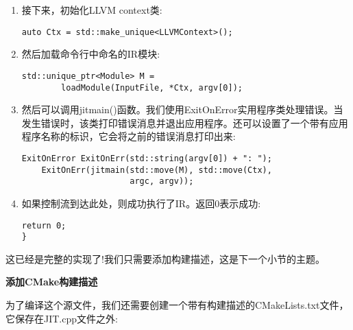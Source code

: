 \begin{enumerate}
\begin{lstlisting}[caption={}]
	InitializeNativeTarget();
	InitializeNativeTargetAsmPrinter();
	InitializeNativeTargetAsmParser();
	
	cl::ParseCommandLineOptions(argc, argv,
	     						"JIT\n");
\end{lstlisting}

\item 接下来，初始化LLVM context类:
\begin{lstlisting}[caption={}]
	auto Ctx = std::make_unique<LLVMContext>();
\end{lstlisting}

\item 然后加载命令行中命名的IR模块:
\begin{lstlisting}[caption={}]
	std::unique_ptr<Module> M =
		loadModule(InputFile, *Ctx, argv[0]);
\end{lstlisting}

\item 然后可以调用jitmain()函数。我们使用ExitOnError实用程序类处理错误。当发生错误时，该类打印错误消息并退出应用程序。还可以设置了一个带有应用程序名称的标识，它会将之前的错误消息打印出来:
\begin{lstlisting}[caption={}]
	ExitOnError ExitOnErr(std::string(argv[0]) + ": ");
	ExitOnErr(jitmain(std::move(M), std::move(Ctx),
					  argc, argv));
\end{lstlisting}

\item 如果控制流到达此处，则成功执行了IR。返回0表示成功:
\begin{lstlisting}[caption={}]
	return 0;
}
\end{lstlisting}

\end{enumerate}

这已经是完整的实现了!我们只需要添加构建描述，这是下一个小节的主题。 \par

\hspace*{\fill} \par %
\textbf{添加CMake构建描述}

为了编译这个源文件，我们还需要创建一个带有构建描述的CMakeLists.txt文件，它保存在JIT.cpp文件之外:\par

